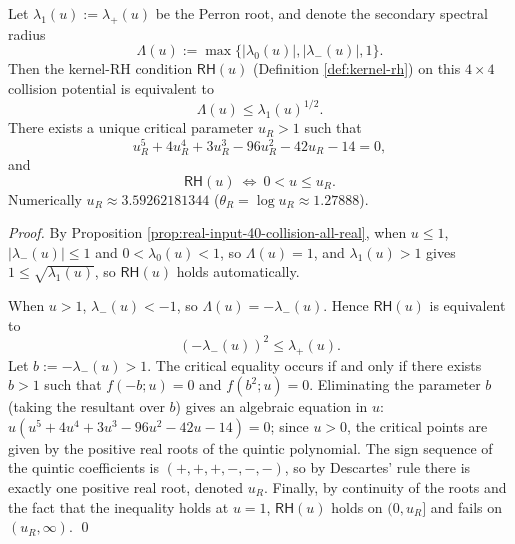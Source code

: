 \begin{proposition}\label{prop:real-input-40-collision-rhk-window}
Let \(\lambda_1(u):=\lambda_+(u)\) be the Perron root, and denote the secondary spectral radius
\[
\Lambda(u):=\max\{|\lambda_0(u)|,|\lambda_-(u)|,1\}.
\]
Then the kernel-RH condition \(\textsf{RH}(u)\) (Definition \ref{def:kernel-rh}) on this \(4\times4\) collision potential is equivalent to
\[
\Lambda(u)\le \lambda_1(u)^{1/2}.
\]
There exists a unique critical parameter \(u_R>1\) such that
\[
u_R^5+4u_R^4+3u_R^3-96u_R^2-42u_R-14=0,
\]
and
\[
\textsf{RH}(u)\ \Longleftrightarrow\ 0<u\le u_R.
\]
Numerically \(u_R\approx 3.59262181344\) (\(\theta_R=\log u_R\approx 1.27888\)).
\end{proposition}
\begin{proof}
By Proposition \ref{prop:real-input-40-collision-all-real}, when \(u\le 1\), \(|\lambda_-(u)|\le 1\) and \(0<\lambda_0(u)<1\), so \(\Lambda(u)=1\), and \(\lambda_1(u)>1\) gives \(1\le \sqrt{\lambda_1(u)}\), so \(\textsf{RH}(u)\) holds automatically.

When \(u>1\), \(\lambda_-(u)<-1\), so \(\Lambda(u)=-\lambda_-(u)\).
Hence \(\textsf{RH}(u)\) is equivalent to
\[
(-\lambda_-(u))^2\le \lambda_+(u).
\]
Let \(b:=-\lambda_-(u)>1\). The critical equality occurs if and only if there exists \(b>1\) such that
\(
f(-b;u)=0
\)
and
\(
f(b^2;u)=0
\).
Eliminating the parameter \(b\) (taking the resultant over \(b\)) gives an algebraic equation in \(u\):
\(
u(u^5+4u^4+3u^3-96u^2-42u-14)=0
\);
since \(u>0\), the critical points are given by the positive real roots of the quintic polynomial. The sign sequence of the quintic coefficients is \((+,+,+,-,-,-)\), so by Descartes' rule there is exactly one positive real root, denoted \(u_R\).
Finally, by continuity of the roots and the fact that the inequality holds at \(u=1\), \(\textsf{RH}(u)\) holds on \((0,u_R]\) and fails on \((u_R,\infty)\). \qed
\end{proof}

